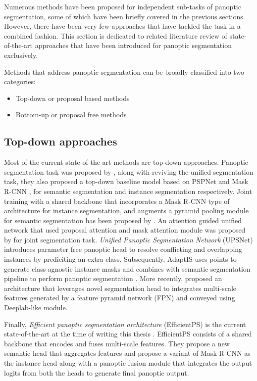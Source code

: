 Numerous methods have been proposed for independent sub-tasks of panoptic segmentation, some of which have been briefly covered in the previous sections. However, there have been very few approaches that have tackled the task in a combined fashion. This section is dedicated to related literature review of state-of-the-art approaches that have been introduced for panoptic segmentation exclusively. 

Methods that address panoptic segmentation can be broadly classified into two
categories: 
\begin{itemize}
    \item Top-down or proposal based methods
    \item Bottom-up or proposal free methods
\end{itemize}


\subsection{Top-down approaches}

Most of the current state-of-the-art methods are top-down approaches. Panoptic segmentation task was proposed by \cite{Kirillov2019}, along with reviving the unified segmentation task, they also proposed a top-down baseline model based on PSPNet \cite{Zhao2017} and Mask R-CNN \cite{He2017}, for semantic segmentation and instance segmentation respectively. Joint training with a shared backbone that incorporates a Mask R-CNN type of architecture for instance segmentation, and augments a pyramid pooling module for semantic segmentation has been proposed by \cite{DBLPDaandeGues:journals/corr/abs-1809-02110}. An attention guided unified network that used proposal attention and mask attention module was proposed by \cite{Li2019} for joint segmentation task.
\textit{Unified Panoptic Segmentation Network} (UPSNet) introduces parameter free panoptic head to resolve conflicting and overlapping instances by prediciting an extra class. Subsequently, AdaptIS uses points to generate class agnostic instance masks and combines with semantic segmentation pipeline to perform panoptic segmentation \cite{adaptis2019}. More recently, \cite{Porzi2019} proposed an architecture that leverages novel segmentation head to integrates multi-scale features generated by a feature pyramid network (FPN) \cite{Lin2017} and conveyed using Deeplab-like \cite{Chen2018} module. 


Finally, \textit{Efficient panoptic segmentation architecture} (EfficientPS) is the current state-of-the-art at the time of writing this thesis \cite{mohan2020efficientps}. EfficientPS consists of a shared backbone that encodes and fuses multi-scale features. They propose a new semantic
head that aggregates features and propose a variant of Mask R-CNN as the instance head along-with a panoptic fusion module that integrates the output logits from both the heads to generate final panoptic output.

